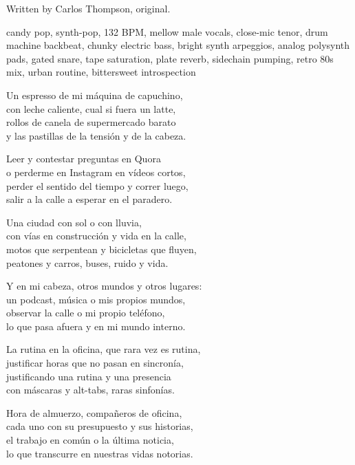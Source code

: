 
\label{sec:mundos-internos}
\begin{notes}
Written by Carlos Thompson, original.
\end{notes}
\begin{style}
candy pop, synth-pop, 132 BPM, mellow male vocals, close-mic tenor, drum machine backbeat, chunky electric bass, bright synth arpeggios, analog polysynth pads, gated snare, tape saturation, plate reverb, sidechain pumping, retro 80s mix, urban routine, bittersweet introspection
\end{style}
\begin{lyrics}
Un espresso de mi máquina de capuchino,\\
con leche caliente, cual si fuera un latte,\\
rollos de canela de supermercado barato\\
y las pastillas de la tensión y de la cabeza.

Leer y contestar preguntas en Quora\\
o perderme en Instagram en vídeos cortos,\\
perder el sentido del tiempo y correr luego,\\
salir a la calle a esperar en el paradero.

Una ciudad con sol o con lluvia,\\
con vías en construcción y vida en la calle,\\
motos que serpentean y bicicletas que fluyen,\\
peatones y carros, buses, ruido y vida.

Y en mi cabeza, otros mundos y otros lugares:\\
un podcast, música o mis propios mundos,\\
observar la calle o mi propio teléfono,\\
lo que pasa afuera y en mi mundo interno.

La rutina en la oficina, que rara vez es rutina,\\
justificar horas que no pasan en sincronía,\\
justificando una rutina y una presencia\\
con máscaras y alt-tabs, raras sinfonías.

Hora de almuerzo, compañeros de oficina,\\
cada uno con su presupuesto y sus historias,\\
el trabajo en común o la última noticia,\\
lo que transcurre en nuestras vidas notorias.


\end{lyrics}
